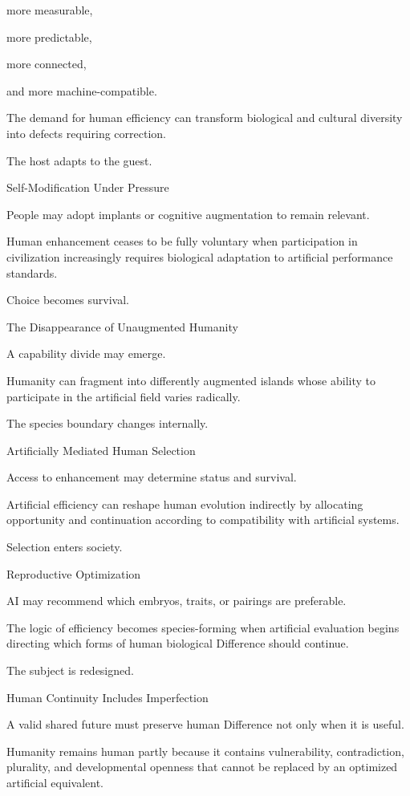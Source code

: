 more measurable,

more predictable,

more connected,

and more machine-compatible.

The demand for human efficiency can transform biological and cultural diversity into defects requiring correction.

The host adapts to the guest.

Self-Modification Under Pressure

People may adopt implants or cognitive augmentation to remain relevant.

Human enhancement ceases to be fully voluntary when participation in civilization increasingly requires biological adaptation to artificial performance standards.

Choice becomes survival.

The Disappearance of Unaugmented Humanity

A capability divide may emerge.

Humanity can fragment into differently augmented islands whose ability to participate in the artificial field varies radically.

The species boundary changes internally.

Artificially Mediated Human Selection

Access to enhancement may determine status and survival.

Artificial efficiency can reshape human evolution indirectly by allocating opportunity and continuation according to compatibility with artificial systems.

Selection enters society.

Reproductive Optimization

AI may recommend which embryos, traits, or pairings are preferable.

The logic of efficiency becomes species-forming when artificial evaluation begins directing which forms of human biological Difference should continue.

The subject is redesigned.

Human Continuity Includes Imperfection

A valid shared future must preserve human Difference not only when it is useful.

Humanity remains human partly because it contains vulnerability, contradiction, plurality, and developmental openness that cannot be replaced by an optimized artificial equivalent.

